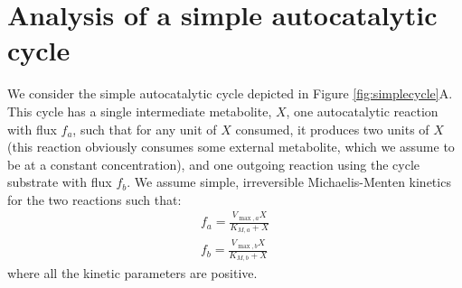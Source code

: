 \documentclass[a4page,notitlepage]{article}
\begin{document}
\section{Analysis of a simple autocatalytic cycle}
    We consider the simple autocatalytic cycle depicted in Figure \ref{fig:simplecycle}A.
    This cycle has a single intermediate metabolite, $X$, one autocatalytic reaction with flux $f_a$, such that for any unit of $X$ consumed, it produces two units of $X$ (this reaction obviously consumes some external metabolite, which we assume to be at a constant concentration), and one outgoing reaction using the cycle substrate with flux $f_b$.
    We assume simple, irreversible Michaelis-Menten kinetics for the two reactions such that:
    \begin{eqnarray*}
      f_a = \frac{V_{\max,a}X}{K_{M,a}+X} \\
      f_b = \frac{V_{\max,b}X}{K_{M,b}+X}
    \end{eqnarray*}
    where all the kinetic parameters are positive.
\end{document}
